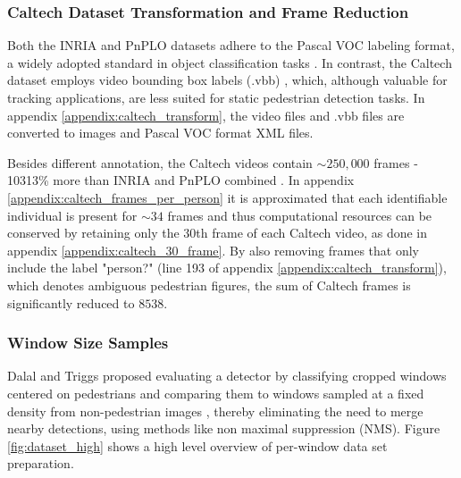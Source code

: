 \subsubsection{Caltech Dataset Transformation and Frame Reduction}\label{sec:caltech_trasnform}

Both the INRIA and PnPLO datasets adhere to the Pascal VOC labeling format, a widely adopted standard in object classification tasks \cite{everingham_2009_pascal}. In contrast, the Caltech dataset employs video bounding box labels (.vbb) \cite{mathworks_vbbLabeler}, which, although valuable for tracking applications, are less suited for static pedestrian detection tasks. In appendix \ref{appendix:caltech_transform}, the video files and .vbb files  are converted to images and Pascal VOC format XML files.

Besides different annotation, the Caltech videos contain $\sim 250,000$ frames \cite{dollar_2009_pedestrian} - 10313\% more than INRIA and PnPLO combined \cite{karthika_2020_addressing} \cite{dalal_2005_histograms}. In appendix \ref{appendix:caltech_frames_per_person} it is approximated that each identifiable individual is present for $\sim 34$ frames and thus computational resources can be conserved by retaining only the $30$th frame of each Caltech video, as done in appendix \ref{appendix:caltech_30_frame}. By also removing frames that only include the label "person?" (line 193 of appendix \ref{appendix:caltech_transform}), which denotes ambiguous pedestrian figures, the sum of Caltech frames is significantly reduced to $8538$.

\subsubsection{Window Size Samples}

Dalal and Triggs proposed evaluating a detector by classifying cropped windows centered on pedestrians and comparing them to windows sampled at a fixed density from non-pedestrian images \cite{dalal_2005_histograms}, thereby eliminating the need to merge nearby detections, using methods like non maximal suppression (NMS). Figure \ref{fig:dataset_high} shows a high level overview of per-window data set preparation.

